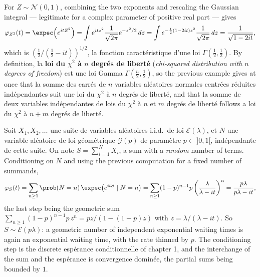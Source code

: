 \begin{example}
For $Z \sim \mathcal{N}(0,1)$, combining the two exponents and rescaling the Gaussian
integral --- legitimate for a complex parameter of positive real part --- gives
\[
  \varphi_{Z^{2}}(t) = \expec\!\left(e^{itZ^{2}}\right) = \int
  e^{itz^{2}}\frac{1}{\sqrt{2\pi}}e^{-z^{2}/2}\,dz = \int e^{-\frac{1}{2}(1 -
  2it)z^{2}}\frac{1}{\sqrt{2\pi}}\,dz = \frac{1}{\sqrt{1 - 2it}},
\]
which is $\left(\tfrac{1}{2}/(\tfrac{1}{2} - it)\right)^{1/2}$, la fonction caractéristique
d'une loi $\Gamma(\tfrac{1}{2},\tfrac{1}{2})$. By definition, la \textbf{loi du $\chi^{2}$ à
$n$ degrés de liberté} (\textit{chi-squared distribution with $n$ degrees of freedom}) est une
loi Gamma $\Gamma(\tfrac{n}{2},\tfrac{1}{2})$, so the previous example gives at once that la
somme des carrés de $n$ variables aléatoires normales centrées réduites indépendantes suit une
loi du $\chi^{2}$ à $n$ degrés de liberté, and that la somme de deux variables indépendantes de
lois du $\chi^{2}$ à $n$ et $m$ degrés de liberté follows a loi du $\chi^{2}$ à $n + m$
degrés de liberté.
\end{example}

\begin{example}
Soit $X_{1}, X_{2}, \dots$ une suite de variables aléatoires i.i.d.\ de loi $\mathcal{E}(\lambda)$,
et $N$ une variable aléatoire de loi géométrique $\mathcal{G}(p)$ de paramètre $p \in\, ]0,1[$,
indépendante de cette suite. On note $S = \sum_{i=1}^{N} X_{i}$, a sum with a \emph{random}
number of terms. Conditioning on $N$ and using the
previous computation for a fixed number of summands,
\[
  \varphi_{S}(t) = \sum_{n \geq 1} \prob(N = n)\, \expec\!\left(e^{itS} \mid N = n\right) =
  \sum_{n \geq 1} (1-p)^{n-1}p\left(\frac{\lambda}{\lambda - it}\right)^{n} =
  \frac{p\lambda}{p\lambda - it},
\]
the last step being the geometric sum $\sum_{n \geq 1}(1-p)^{n-1}p\,z^{n} = pz/(1-(1-p)z)$
with $z = \lambda/(\lambda - it)$. So $S \sim \mathcal{E}(p\lambda)$: a geometric number of
independent exponential waiting times is again an exponential waiting time, with the rate
thinned by $p$. The conditioning step is the discrete espérance conditionnelle of chapter 1,
and the interchange of the sum and the espérance is convergence dominée, the partial
sums being bounded by $1$.
\end{example}

